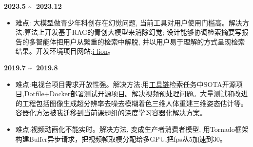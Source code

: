 \documentclass[UTF8,AutoFakeBold]{resume}
\begin{document}
{\large\textbf{2023.5 \textasciitilde \ 2023.12}}
    \begin{itemize}
      \item \kaishu 难点: 大模型做青少年科创存在幻觉问题, 当前工具对用户使用门槛高。解决方法:算法上开发基于RAG的青创大模型来消除幻觉; 设计能够协调检索摘要写报告的多智能体把用户从繁重的检索中解脱, 并以用户易于理解的方式呈现检索结果。开发环境项目网站:\href{http://106.14.61.143:8889/ai_chat}{i-lion}。
    \end{itemize}

{\large\textbf{2019.7 \textasciitilde \ 2019.8}}
    \begin{itemize}
      \item \kaishu 难点:电视台项目需求开放性强。解决方法:用\href{https://zhuanlan.zhihu.com/p/671425463}{工具链}检索任务中SOTA开源项目,Dotfile+Docker部署测试开源项目。解决视频预处理问题。大量测试和改进的工程包括图像生成超分辨率去噪去模糊着色三维人体重建三维姿态估计等。容器化方法被我迁移到\href{https://ecnuvis.net/}{当前课题组}的\href{https://zhuanlan.zhihu.com/p/682477952}{深度学习容器化解决方案}。
      \item \kaishu 难点:视频动画化不能实时。解决方法, 变成生产者消费者模型, 用Tornado框架构建Buffer异步请求，把视频帧取模分配给多GPU,把fps从5加速到30。
    \end{itemize}

\end{document}
